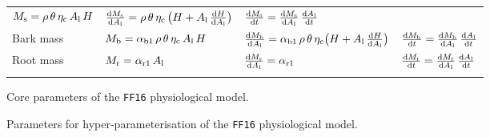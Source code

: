 \documentclass[10pt,twoside]{article}
\begin{document}
\begin{table}[h!]
\begin{tabular}{p{2.5cm}p{3.5cm}p{5cm}p{4cm} }
$M_{\rm s} = \rho \, \theta \, \eta_{\rm c} \, A_{\rm l} \, H $ &
$\frac{{\rm d}M_{\rm s}}{{\rm d}A_{\rm l}} = \rho \, \theta \, \eta_{\rm c} \, \big(H + A_{\rm l} \, \frac{{\rm d}H}{{\rm d}A_{\rm l}} \big)$ &
$\frac{{\rm d}M_{\rm s}}{{\rm d}t} = \frac{{\rm d}M_{\rm s}}{{\rm d}A_{\rm l}} \, \frac{{\rm d}A_{\rm l}}{{\rm d}t}$ \\
Bark mass &
$M_{\rm b} = \alpha_{{\rm b1}} \, \rho \, \theta \, \eta_{\rm c} \, A_{\rm l} \, H $ &
$\frac{{\rm d}M_{\rm b}}{{\rm d}A_{\rm l}} = \alpha_{{\rm b1}} \, \rho \, \theta \, \eta_{\rm c}\big(H + A_{\rm l} \, \frac{{\rm d}H}{{\rm d}A_{\rm l}} \big)$ &
$\frac{{\rm d}M_{\rm b}}{{\rm d}t} = \frac{{\rm d}M_{\rm b}}{{\rm d}A_{\rm l}} \, \frac{{\rm d}A_{\rm l}}{{\rm d}t}$ \\
Root mass &
$M_{\rm r} = \alpha_{{\rm r1}} \, A_{\rm l}$ &
$\frac{{\rm d}M_{\rm r}}{{\rm d}A_{\rm l}} = \alpha_{{\rm r1}}$ &
$\frac{{\rm d}M_{\rm r}}{{\rm d}t} = \frac{{\rm d}M_{\rm r}}{{\rm d}A_{\rm l}} \, \frac{{\rm d}A_{\rm l}}{{\rm d}t}$ \\
\hline \\
\end{tabular}
\label{tab:allometry}
\end{table}

\newpage

\begin{table}[h!]
\caption{Core parameters of the \texttt{FF16} physiological model.}

\label{tab:params_core}
\end{table}

\begin{table}[h!]
\caption{Parameters for hyper-parameterisation of the \texttt{FF16} physiological model.}

\label{tab:params_hyper}
\end{table}

\clearpage


\end{document}
